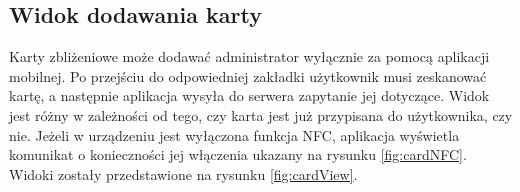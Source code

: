 \subsection{Widok dodawania karty}

Karty zbliżeniowe może dodawać administrator wyłącznie za pomocą aplikacji mobilnej. Po przejściu do odpowiedniej zakładki użytkownik musi zeskanować kartę, a następnie aplikacja wysyła do serwera zapytanie jej dotyczące. Widok jest różny w zależności od tego, czy karta jest już przypisana do użytkownika, czy nie. Jeżeli w urządzeniu jest wyłączona funkcja NFC, aplikacja wyświetla komunikat o konieczności jej włączenia ukazany na rysunku \ref{fig:cardNFC}. Widoki zostały przedstawione na rysunku \ref{fig:cardView}.

\begin{figure}[H]
    \centering
    \begin{subfigure}[b]{0.3\textwidth}
        \centering

\end{subfigure}
\end{figure}
